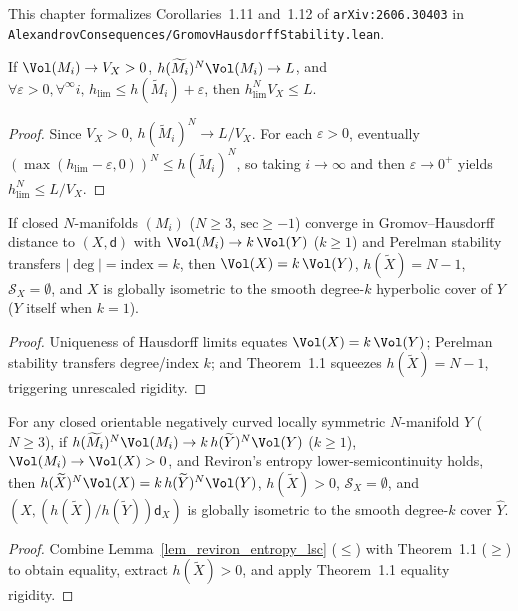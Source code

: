 This chapter formalizes Corollaries~1.11 and~1.12 of \texttt{arXiv:2606.30403} in
\texttt{AlexandrovConsequences/GromovHausdorffStability.lean}.

\begin{lemma}
\label{lem_reviron_entropy_lsc}
\leanok
If $\Vol(M_i) \to V_X > 0$, $h(\widetilde{M}_i)^N \Vol(M_i) \to L$, and
$\forall \varepsilon > 0, \forall^\infty i,\, h_{\mathrm{lim}} \le h(\widetilde{M}_i) + \varepsilon$,
then $h_{\mathrm{lim}}^N V_X \le L$.
\end{lemma}
\begin{proof}\leanok
Since $V_X > 0$, $h(\widetilde{M}_i)^N \to L / V_X$. For each $\varepsilon > 0$, eventually
$(\max(h_{\mathrm{lim}} - \varepsilon, 0))^N \le h(\widetilde{M}_i)^N$, so taking $i \to \infty$
and then $\varepsilon \to 0^+$ yields $h_{\mathrm{lim}}^N \le L / V_X$.
\end{proof}

\begin{corollary}
\label{cor_gh_stability}
\leanok
{}
If closed $N$-manifolds $(M_i)$ ($N \ge 3$, $\mathrm{sec} \ge -1$) converge in Gromov--Hausdorff
distance to $(X, \mathsf{d})$ with $\Vol(M_i) \to k\,\Vol(Y)$ ($k \ge 1$) and Perelman stability
transfers $|\deg| = \mathrm{index} = k$, then $\Vol(X) = k\,\Vol(Y)$, $h(\widetilde{X}) = N - 1$,
$\mathcal{S}_X = \emptyset$, and $X$ is globally isometric to the smooth degree-$k$ hyperbolic cover
of $Y$ ($Y$ itself when $k = 1$).
\end{corollary}
\begin{proof}\leanok
Uniqueness of Hausdorff limits equates $\Vol(X) = k\,\Vol(Y)$; Perelman stability transfers
degree/index $k$; and Theorem~1.1 squeezes $h(\widetilde{X}) = N - 1$, triggering unrescaled rigidity.
\end{proof}

\begin{corollary}
\label{cor_gh_stability2}
\leanok
{}
For any closed orientable negatively curved locally symmetric $N$-manifold $Y$ ($N \ge 3$), if
$h(\widetilde{M}_i)^N \Vol(M_i) \to k\,h(\widetilde{Y})^N \Vol(Y)$ ($k \ge 1$), $\Vol(M_i) \to \Vol(X) > 0$,
and Reviron's entropy lower-semicontinuity holds, then $h(\widetilde{X})^N \Vol(X) = k\,h(\widetilde{Y})^N \Vol(Y)$,
$h(\widetilde{X}) > 0$, $\mathcal{S}_X = \emptyset$, and $(X, (h(\widetilde{X})/h(\widetilde{Y}))\mathsf{d}_X)$
is globally isometric to the smooth degree-$k$ cover $\widehat{Y}$.
\end{corollary}
\begin{proof}\leanok
Combine Lemma~\ref{lem_reviron_entropy_lsc} ($\le$) with Theorem~1.1 ($\ge$) to obtain equality,
extract $h(\widetilde{X}) > 0$, and apply Theorem~1.1 equality rigidity.
\end{proof}

